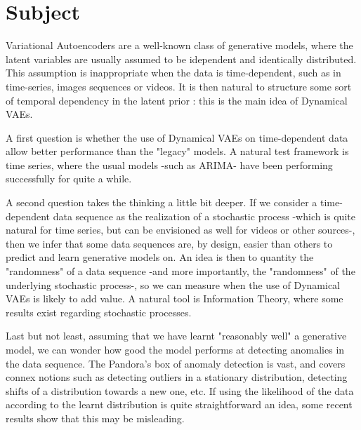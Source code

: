 \chapter{Subject}\label{sec:Subject}

Variational Autoencoders are a well-known class of generative models, where the latent variables are usually assumed to be idependent and identically distributed. This assumption is inappropriate when the data is time-dependent, such as in time-series, images sequences or videos. It is then natural to structure some sort of temporal dependency in the latent prior : this is the main idea of Dynamical VAEs.

A first question is whether the use of Dynamical VAEs on time-dependent data allow better performance than the "legacy" models. A natural test framework is time series, where the usual models -such as ARIMA- have been performing successfully for quite a while.

A second question takes the thinking a little bit deeper. If we consider a time-dependent data sequence as the realization of a stochastic process -which is quite natural for time series, but can be envisioned as well for videos or other sources-, then we infer that some data sequences are, by design, easier than others to predict and learn generative models on. An idea is then to quantity the "randomness" of a data sequence -and more importantly, the "randomness" of the underlying stochastic process-, so we can measure when the use of Dynamical VAEs is likely to add value. A natural tool is Information Theory, where some results exist regarding stochastic processes.

Last but not least, assuming that we have learnt "reasonably well" a generative model, we can wonder how good the model performs at detecting anomalies in the data sequence. The Pandora's box of anomaly detection is vast, and covers connex notions such as detecting outliers in a stationary distribution, detecting shifts of a distribution towards a new one, etc. If using the likelihood of the data according to the learnt distribution is quite straightforward an idea, some recent results show that this may be misleading.
